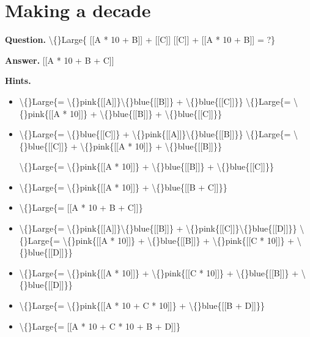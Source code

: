\documentclass{article}
\begin{document}
\section*{Making a decade}
\textbf{Question.} \textbackslash\{\}Large\{
                        [[A * 10 + B]] + [[C]]
                        [[C]] + [[A * 10 + B]]
                    = ?\}

\textbf{Answer.} [[A * 10 + B + C]]

\textbf{Hints.}
\begin{itemize}
  \item \textbackslash\{\}Large\{= \textbackslash\{\}pink\{[[A]]\}\textbackslash\{\}blue\{[[B]]\} + \textbackslash\{\}blue\{[[C]]\}\}
                        \textbackslash\{\}Large\{= \textbackslash\{\}pink\{[[A * 10]]\} + \textbackslash\{\}blue\{[[B]]\} + \textbackslash\{\}blue\{[[C]]\}\}
  \item \textbackslash\{\}Large\{= \textbackslash\{\}blue\{[[C]]\} + \textbackslash\{\}pink\{[[A]]\}\textbackslash\{\}blue\{[[B]]\}\}
                            \textbackslash\{\}Large\{= \textbackslash\{\}blue\{[[C]]\} + \textbackslash\{\}pink\{[[A * 10]]\} + \textbackslash\{\}blue\{[[B]]\}\}
                        
                        \textbackslash\{\}Large\{= \textbackslash\{\}pink\{[[A * 10]]\} + \textbackslash\{\}blue\{[[B]]\} + \textbackslash\{\}blue\{[[C]]\}\}
  \item \textbackslash\{\}Large\{= \textbackslash\{\}pink\{[[A * 10]]\} + \textbackslash\{\}blue\{[[B + C]]\}\}
  \item \textbackslash\{\}Large\{= [[A * 10 + B + C]]\}
  \item \textbackslash\{\}Large\{= \textbackslash\{\}pink\{[[A]]\}\textbackslash\{\}blue\{[[B]]\} + \textbackslash\{\}pink\{[[C]]\}\textbackslash\{\}blue\{[[D]]\}\}
                        \textbackslash\{\}Large\{= \textbackslash\{\}pink\{[[A * 10]]\} + \textbackslash\{\}blue\{[[B]]\} + \textbackslash\{\}pink\{[[C * 10]]\} + \textbackslash\{\}blue\{[[D]]\}\}
  \item \textbackslash\{\}Large\{= \textbackslash\{\}pink\{[[A * 10]]\} + \textbackslash\{\}pink\{[[C * 10]]\} + \textbackslash\{\}blue\{[[B]]\} + \textbackslash\{\}blue\{[[D]]\}\}
  \item \textbackslash\{\}Large\{= \textbackslash\{\}pink\{[[A * 10 + C * 10]]\} + \textbackslash\{\}blue\{[[B + D]]\}\}
  \item \textbackslash\{\}Large\{= [[A * 10 + C * 10 + B + D]]\}
\end{itemize}
\end{document}

